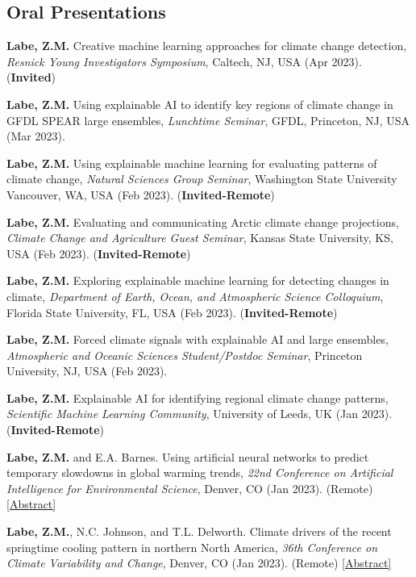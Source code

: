 \documentclass[margin,line,palatino,courier,10pt]{res}
\begin{document}
\begin{resume}
\section{\sc \textcolor{Cerulean}{\large{\textbf{Oral Presentations}}}}
\begin{etaremune}[leftmargin=0in,topsep=0in,parsep=0in]
\item \textbf{Labe, Z.M.} Creative machine learning approaches for climate change detection, \textit{Resnick Young Investigators Symposium}, Caltech, NJ, USA (Apr 2023). (\textbf{Invited}) 
\item \textbf{Labe, Z.M.} Using explainable AI to identify key regions of climate change in GFDL SPEAR large ensembles, \textit{Lunchtime Seminar}, GFDL, Princeton, NJ, USA (Mar 2023). 
\item \textbf{Labe, Z.M.} Using explainable machine learning for evaluating patterns of climate change, \textit{Natural Sciences Group Seminar}, Washington State University Vancouver, WA, USA (Feb 2023). (\textbf{Invited-Remote})
\item \textbf{Labe, Z.M.} Evaluating and communicating Arctic climate change projections, \textit{Climate Change and Agriculture Guest Seminar}, Kansas State University, KS, USA (Feb 2023). (\textbf{Invited-Remote})
\item \textbf{Labe, Z.M.} Exploring explainable machine learning for detecting changes in climate, \textit{Department of Earth, Ocean, and Atmospheric Science Colloquium}, Florida State University, FL, USA (Feb 2023). (\textbf{Invited-Remote})
\item \textbf{Labe, Z.M.} Forced climate signals with explainable AI and large ensembles, \textit{Atmospheric and Oceanic Sciences Student/Postdoc Seminar}, Princeton University, NJ, USA (Feb 2023).
\item \textbf{Labe, Z.M.} Explainable AI for identifying regional climate change patterns, \textit{Scientific Machine Learning Community}, University of Leeds, UK (Jan 2023). (\textbf{Invited-Remote})
\item \textbf{Labe, Z.M.} and E.A. Barnes. Using artificial neural networks to predict temporary slowdowns in global warming trends, \textit{22nd Conference on Artificial Intelligence for Environmental Science}, Denver, CO (Jan 2023). (Remote) \href{https://ams.confex.com/ams/103ANNUAL/meetingapp.cgi/Paper/415460}{[Abstract]}
\item \textbf{Labe, Z.M.}, N.C. Johnson, and T.L. Delworth. Climate drivers of the recent springtime cooling pattern in northern North America, \textit{36th Conference on Climate Variability and Change}, Denver, CO (Jan 2023). (Remote) \href{https://ams.confex.com/ams/103ANNUAL/meetingapp.cgi/Paper/415409}{[Abstract]}

\end{etaremune}
\end{resume}
\end{document}
